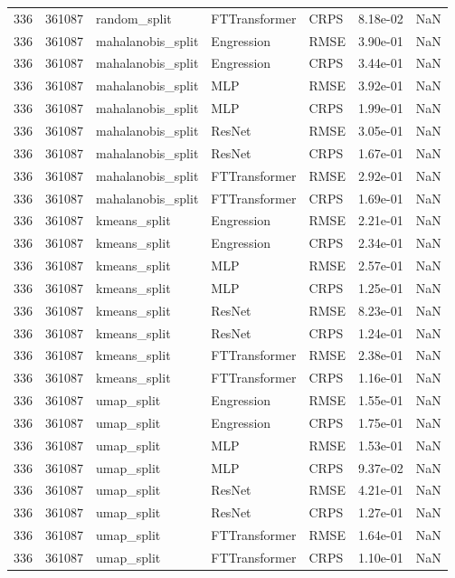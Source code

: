 \begin{tabular}{rrlllrr}
336 & 361087 & random\_split & FTTransformer & CRPS & 8.18e-02 & NaN \\
336 & 361087 & mahalanobis\_split & Engression & RMSE & 3.90e-01 & NaN \\
336 & 361087 & mahalanobis\_split & Engression & CRPS & 3.44e-01 & NaN \\
336 & 361087 & mahalanobis\_split & MLP & RMSE & 3.92e-01 & NaN \\
336 & 361087 & mahalanobis\_split & MLP & CRPS & 1.99e-01 & NaN \\
336 & 361087 & mahalanobis\_split & ResNet & RMSE & 3.05e-01 & NaN \\
336 & 361087 & mahalanobis\_split & ResNet & CRPS & 1.67e-01 & NaN \\
336 & 361087 & mahalanobis\_split & FTTransformer & RMSE & 2.92e-01 & NaN \\
336 & 361087 & mahalanobis\_split & FTTransformer & CRPS & 1.69e-01 & NaN \\
336 & 361087 & kmeans\_split & Engression & RMSE & 2.21e-01 & NaN \\
336 & 361087 & kmeans\_split & Engression & CRPS & 2.34e-01 & NaN \\
336 & 361087 & kmeans\_split & MLP & RMSE & 2.57e-01 & NaN \\
336 & 361087 & kmeans\_split & MLP & CRPS & 1.25e-01 & NaN \\
336 & 361087 & kmeans\_split & ResNet & RMSE & 8.23e-01 & NaN \\
336 & 361087 & kmeans\_split & ResNet & CRPS & 1.24e-01 & NaN \\
336 & 361087 & kmeans\_split & FTTransformer & RMSE & 2.38e-01 & NaN \\
336 & 361087 & kmeans\_split & FTTransformer & CRPS & 1.16e-01 & NaN \\
336 & 361087 & umap\_split & Engression & RMSE & 1.55e-01 & NaN \\
336 & 361087 & umap\_split & Engression & CRPS & 1.75e-01 & NaN \\
336 & 361087 & umap\_split & MLP & RMSE & 1.53e-01 & NaN \\
336 & 361087 & umap\_split & MLP & CRPS & 9.37e-02 & NaN \\
336 & 361087 & umap\_split & ResNet & RMSE & 4.21e-01 & NaN \\
336 & 361087 & umap\_split & ResNet & CRPS & 1.27e-01 & NaN \\
336 & 361087 & umap\_split & FTTransformer & RMSE & 1.64e-01 & NaN \\
336 & 361087 & umap\_split & FTTransformer & CRPS & 1.10e-01 & NaN \\

\end{tabular}
